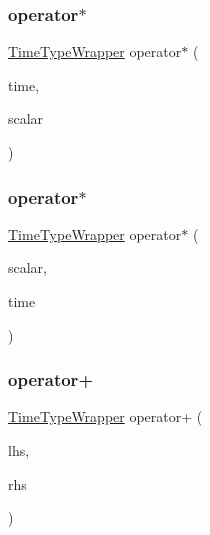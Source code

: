 \subsubsection{\texorpdfstring{operator$\ast$}{operator*}\hspace{0.1cm}{\footnotesize\ttfamily [2/3]}}
{\footnotesize\ttfamily \hyperlink{structvt_1_1_time_type_wrapper}{Time\+Type\+Wrapper} operator$\ast$ (\begin{DoxyParamCaption}\item[{const \hyperlink{structvt_1_1_time_type_wrapper}{Time\+Type\+Wrapper} \&}]{time,  }\item[{const double}]{scalar }\end{DoxyParamCaption})\hspace{0.3cm}{\ttfamily [friend]}}

\mbox{\label{structvt_1_1_time_type_wrapper_a33285e8caada86dd610c4acd27471287}} 
\subsubsection{\texorpdfstring{operator$\ast$}{operator*}\hspace{0.1cm}{\footnotesize\ttfamily [3/3]}}
{\footnotesize\ttfamily \hyperlink{structvt_1_1_time_type_wrapper}{Time\+Type\+Wrapper} operator$\ast$ (\begin{DoxyParamCaption}\item[{const double}]{scalar,  }\item[{const \hyperlink{structvt_1_1_time_type_wrapper}{Time\+Type\+Wrapper} \&}]{time }\end{DoxyParamCaption})\hspace{0.3cm}{\ttfamily [friend]}}

\mbox{\label{structvt_1_1_time_type_wrapper_ac539ef13d4f25ad2e1245134b4502e35}} 
\subsubsection{\texorpdfstring{operator+}{operator+}}
{\footnotesize\ttfamily \hyperlink{structvt_1_1_time_type_wrapper}{Time\+Type\+Wrapper} operator+ (\begin{DoxyParamCaption}\item[{const \hyperlink{structvt_1_1_time_type_wrapper}{Time\+Type\+Wrapper} \&}]{lhs,  }\item[{const \hyperlink{structvt_1_1_time_type_wrapper}{Time\+Type\+Wrapper} \&}]{rhs }\end{DoxyParamCaption})\hspace{0.3cm}{\ttfamily [friend]}}

